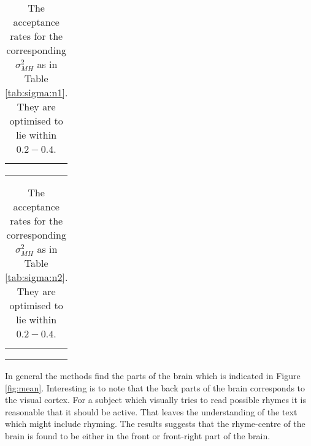 \documentclass[a4paper,english]{article}
\begin{document}
\begin{table}
  \centering
  \begin{tabular}{c c c}
     &  &  \\
     &  &  \\
     &  &  \\
  \end{tabular}
  \caption{The acceptance rates for the corresponding $\sigma_{MH}^2$ as in Table \ref{tab:sigma:n1}. They are optimised to lie within $0.2 - 0.4$.}
  \label{tab:acceptance:n1}
\end{table}

\begin{table}
  \centering
  \begin{tabular}{c c c}
     &  &  \\
     &  &  \\
     &  &  \\
  \end{tabular}
  \caption{The acceptance rates for the corresponding $\sigma_{MH}^2$ as in Table \ref{tab:sigma:n2}. They are optimised to lie within $0.2 - 0.4$.}
  \label{tab:acceptance:n2}
\end{table}


In general the methods find the parts of the brain which is indicated in Figure \ref{fig:mean}.
Interesting is to note that the back parts of the brain corresponds to the visual cortex.
For a subject which visually tries to read possible rhymes it is reasonable that it should be active.
That leaves the understanding of the text which might include rhyming.
The results suggests that the rhyme-centre of the brain is found to be either in the front or front-right part of the brain.
\end{document}
